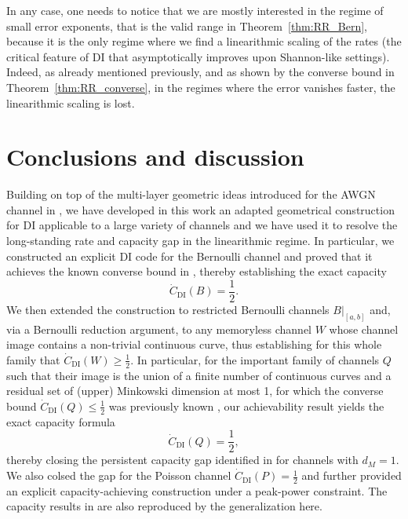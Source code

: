 \documentclass[10pt, conference]{IEEEtran}
\newcommand{\1}{\mathds{1}}
\begin{document}
In any case, one needs to notice that we are mostly interested in the regime of small error exponents, that is the valid range in Theorem~\ref{thm:RR_Bern}, because it is the only regime where we find a linearithmic scaling of the rates (the critical feature of DI that asymptotically improves upon Shannon-like settings). Indeed, as already mentioned previously, and as shown by the converse bound in Theorem~\ref{thm:RR_converse}, in the regimes where the error vanishes faster, the linearithmic scaling is lost. 











\section{Conclusions and discussion}\label{sec:conclusions}
Building on top of the multi-layer geometric ideas introduced for the AWGN channel in \cite{CDBW:Gauss}, we have developed in this work an adapted geometrical construction for DI applicable to a large variety of channels and we have used it to resolve the long-standing rate and capacity gap in the linearithmic regime. In particular, we constructed an explicit DI code for the Bernoulli channel and proved that it achieves the known converse bound in \cite{CDBW:DI_classical}, thereby establishing the exact capacity
\begin{equation}
\dot C_{\text{DI}}(B)=\frac12.
\end{equation}
We then extended the construction to restricted Bernoulli channels $B|_{[a,b]}$ and, via a Bernoulli reduction argument, to any memoryless channel $W$ whose channel image contains a non-trivial continuous curve, thus establishing for this whole family that $\dot C_{\text{DI}}(W)\geq\frac12$. In particular, for the important family of channels $Q$ such that their image is the union of a finite number of continuous curves and a residual set of (upper) Minkowski dimension at most 1, for which the converse bound $\dot C_{\text{DI}}(Q)\leq \frac12$ was previously known \cite{CDBW:DI_classical}, our achievability result yields the exact capacity formula
\begin{equation}
    \dot C_{\text{DI}}(Q)=\frac12,
\end{equation}
thereby closing the persistent capacity gap identified in \cite{CDBW:DI_classical,CDBW:Reliability-TCOM} for channels with $d_M=1$. We also colsed the gap for the Poisson channel $\dot C_{\text{DI}}(P)=\frac12$ and further provided an explicit capacity-achieving construction under a peak-power constraint. The capacity results in \cite{CDBW:Gauss} are also reproduced by the generalization here.
\end{document}
